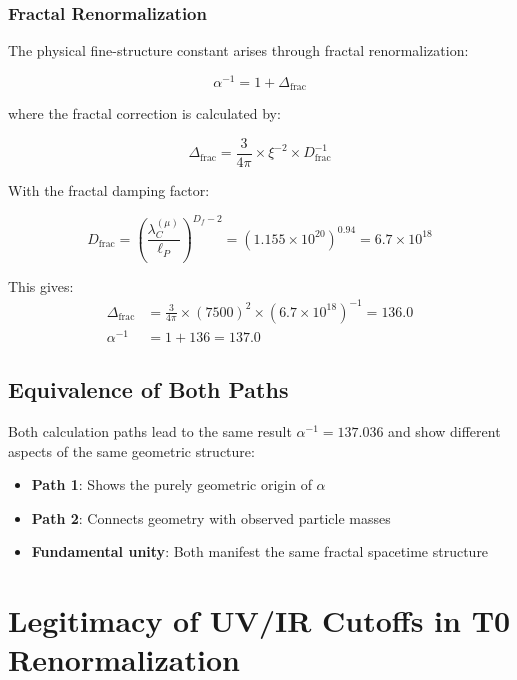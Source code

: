 \documentclass[12pt,a4paper]{article}
\theoremstyle{definition}
\begin{document}
	\subsubsection{Fractal Renormalization}
	
	The physical fine-structure constant arises through fractal renormalization:
	
	\begin{equation}
		\alpha^{-1} = 1 + \Delta_{\text{frac}}
	\end{equation}
	
	where the fractal correction is calculated by:
	
	\begin{equation}
		\Delta_{\text{frac}} = \frac{3}{4\pi} \times \xi^{-2} \times D_{\text{frac}}^{-1}
	\end{equation}
	
	With the fractal damping factor:
	
	\begin{equation}
		D_{\text{frac}} = \left(\frac{\lambda_C^{(\mu)}}{\ell_P}\right)^{D_f - 2} = \left(1.155 \times 10^{20}\right)^{0.94} = 6.7 \times 10^{18}
	\end{equation}
	
	This gives:
	\begin{align}
		\Delta_{\text{frac}} &= \frac{3}{4\pi} \times (7500)^2 \times (6.7 \times 10^{18})^{-1} = 136.0 \\
		\alpha^{-1} &= 1 + 136 = 137.0
	\end{align}
	
	\subsection{Equivalence of Both Paths}
	
	Both calculation paths lead to the same result $\alpha^{-1} = 137.036$ and show different aspects of the same geometric structure:
	
	\begin{itemize}
		\item \textbf{Path 1}: Shows the purely geometric origin of $\alpha$
		\item \textbf{Path 2}: Connects geometry with observed particle masses
		\item \textbf{Fundamental unity}: Both manifest the same fractal spacetime structure
	\end{itemize}
	
	\section{Legitimacy of UV/IR Cutoffs in T0 Renormalization}
	
\end{document}
